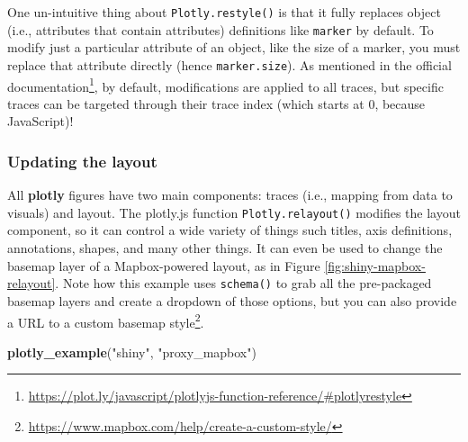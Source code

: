 \documentclass[
  12pt,
]{krantz}
\newenvironment{Shaded}{\begin{snugshade}}{\end{snugshade}}
\newcommand{\KeywordTok}[1]{\textcolor[rgb]{0.13,0.29,0.53}{\textbf{#1}}}
\newcommand{\NormalTok}[1]{#1}
\newcommand{\StringTok}[1]{\textcolor[rgb]{0.31,0.60,0.02}{#1}}
\renewcommand{\href}[2]{#2\footnote{\url{#1}}}
\begin{document}
One un-intuitive thing about \texttt{Plotly.restyle()} is that it fully replaces object (i.e., attributes that contain attributes) definitions like \texttt{marker} by default. To modify just a particular attribute of an object, like the size of a marker, you must replace that attribute directly (hence \texttt{marker.size}). As mentioned in the \href{https://plot.ly/javascript/plotlyjs-function-reference/\#plotlyrestyle}{official documentation}, by default, modifications are applied to all traces, but specific traces can be targeted through their trace index (which starts at 0, because JavaScript)!

\hypertarget{relayout}{%
\subsubsection{Updating the layout}\label{relayout}}


All \textbf{plotly} figures have two main components: traces (i.e., mapping from data to visuals) and layout. The plotly.js function \texttt{Plotly.relayout()} modifies the layout component, so it can control a wide variety of things such titles, axis definitions, annotations, shapes, and many other things. It can even be used to change the basemap layer of a Mapbox-powered layout, as in Figure \ref{fig:shiny-mapbox-relayout}. Note how this example uses \texttt{schema()} to grab all the pre-packaged basemap layers and create a dropdown of those options, but you can also provide a URL to a \href{https://www.mapbox.com/help/create-a-custom-style/}{custom basemap style}.

\begin{Shaded}
\begin{Highlighting}[]
\KeywordTok{plotly_example}\NormalTok{(}\StringTok{"shiny"}\NormalTok{, }\StringTok{"proxy_mapbox"}\NormalTok{)}
\end{Highlighting}
\end{Shaded}
\end{document}
